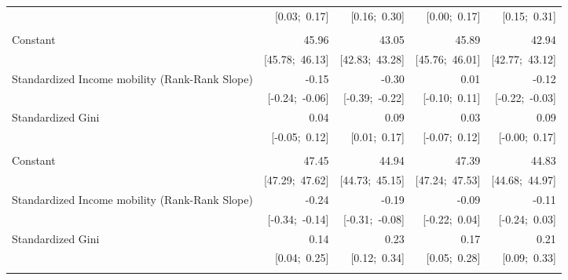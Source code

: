 \begin{table}[htp]
\begin{center}
{\begin{tabular}{l D{.}{.}{5.11} D{.}{.}{5.11} D{.}{.}{5.11} D{.}{.}{5.11} }
                                               & [0.03;\ 0.17]   & [0.16;\ 0.30]   & [0.00;\ 0.17]   & [0.15;\ 0.31]   \\
 \addlinespace[10pt]
 \\
\addlinespace[10pt]
 Constant                                       & 45.96           & 43.05           & 45.89           & 42.94           \\
                                               & [45.78;\ 46.13] & [42.83;\ 43.28] & [45.76;\ 46.01] & [42.77;\ 43.12] \\
Standardized Income mobility (Rank-Rank Slope) & -0.15           & -0.30           & 0.01            & -0.12           \\
                                               & [-0.24;\ -0.06] & [-0.39;\ -0.22] & [-0.10;\ 0.11]  & [-0.22;\ -0.03] \\
Standardized Gini                              & 0.04            & 0.09            & 0.03            & 0.09            \\
                                               & [-0.05;\ 0.12]  & [0.01;\ 0.17]   & [-0.07;\ 0.12]  & [-0.00;\ 0.17]  \\
 \addlinespace[10pt]
 \\
\addlinespace[10pt]
 Constant                                       & 47.45           & 44.94           & 47.39           & 44.83           \\
                                               & [47.29;\ 47.62] & [44.73;\ 45.15] & [47.24;\ 47.53] & [44.68;\ 44.97] \\
Standardized Income mobility (Rank-Rank Slope) & -0.24           & -0.19           & -0.09           & -0.11           \\
                                               & [-0.34;\ -0.14] & [-0.31;\ -0.08] & [-0.22;\ 0.04]  & [-0.24;\ 0.03]  \\
Standardized Gini                              & 0.14            & 0.23            & 0.17            & 0.21            \\
                                               & [0.04;\ 0.25]   & [0.12;\ 0.34]   & [0.05;\ 0.28]   & [0.09;\ 0.33]   \\
 \addlinespace[5pt]
\bottomrule
{}
\end{tabular}
}
\label{inla_models}
\end{center}
\end{table}
